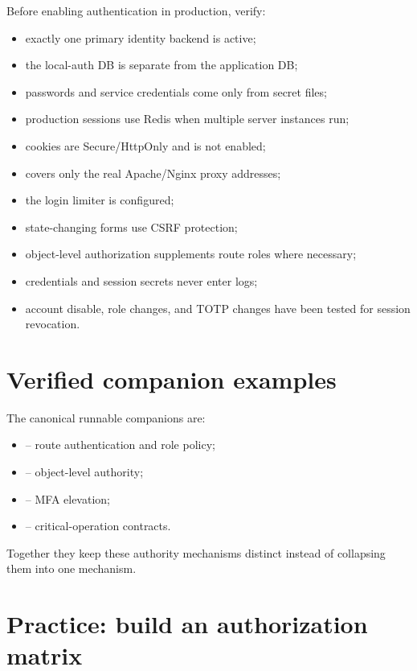 Before enabling authentication in production, verify:

\begin{itemize}
  \item exactly one primary identity backend is active;
  \item the local-auth DB is separate from the application DB;
  \item passwords and service credentials come only from secret files;
  \item production sessions use Redis when multiple server instances run;
  \item cookies are Secure/HttpOnly and  is not enabled;
  \item {} covers only the real Apache/Nginx proxy addresses;
  \item the login limiter is configured;
  \item state-changing forms use CSRF protection;
  \item object-level authorization supplements route roles where necessary;
  \item credentials and session secrets never enter logs;
  \item account disable, role changes, and TOTP changes have been tested for session revocation.
\end{itemize}

\section{Verified companion examples}
The canonical runnable companions are:
\begin{itemize}
  \item {} -- route authentication and role policy;
  \item {} -- object-level authority;
  \item {} -- MFA elevation;
  \item {} -- critical-operation contracts.
\end{itemize}
Together they keep these authority mechanisms distinct instead of collapsing them into one mechanism.

\section{Practice: build an authorization matrix}
